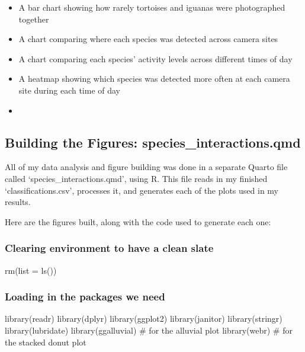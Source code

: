 \documentclass[
  letterpaper,
  DIV=11,
  numbers=noendperiod]{scrartcl}
\newenvironment{Shaded}{\begin{snugshade}}{\end{snugshade}}
\newcommand{\AttributeTok}[1]{\textcolor[rgb]{0.40,0.45,0.13}{#1}}
\newcommand{\CommentTok}[1]{\textcolor[rgb]{0.37,0.37,0.37}{#1}}
\newcommand{\FunctionTok}[1]{\textcolor[rgb]{0.28,0.35,0.67}{#1}}
\newcommand{\NormalTok}[1]{\textcolor[rgb]{0.00,0.23,0.31}{#1}}
\providecommand{\tightlist}{%
  \setlength{\itemsep}{0pt}\setlength{\parskip}{0pt}}
\begin{document}
\begin{itemize}
\tightlist
\item
  A bar chart showing how rarely tortoises and iguanas were photographed
  together
\item
  A chart comparing where each species was detected across camera sites
\item
  A chart comparing each species' activity levels across different times
  of day
\item
  A heatmap showing which species was detected more often at each camera
  site during each time of day
\item
\end{itemize}

\subsection{Building the Figures:
species\_interactions.qmd}\label{building-the-figures-species_interactions.qmd}

All of my data analysis and figure building was done in a separate
Quarto file called `species\_interactions.qmd', using R. This file reads
in my finished `classifications.csv', processes it, and generates each
of the plots used in my results.

Here are the figures built, along with the code used to generate each
one:

\subsubsection{Clearing environment to have a clean
slate}\label{clearing-environment-to-have-a-clean-slate}

\begin{Shaded}
\begin{Highlighting}[]
\FunctionTok{rm}\NormalTok{(}\AttributeTok{list =} \FunctionTok{ls}\NormalTok{())}
\end{Highlighting}
\end{Shaded}

\subsubsection{Loading in the packages we
need}\label{loading-in-the-packages-we-need}

\begin{Shaded}
\begin{Highlighting}[]
\FunctionTok{library}\NormalTok{(readr) }
\FunctionTok{library}\NormalTok{(dplyr)}
\FunctionTok{library}\NormalTok{(ggplot2)}
\FunctionTok{library}\NormalTok{(janitor)}
\FunctionTok{library}\NormalTok{(stringr)}
\FunctionTok{library}\NormalTok{(lubridate)}
\FunctionTok{library}\NormalTok{(ggalluvial) }\CommentTok{\# for the alluvial plot}
\FunctionTok{library}\NormalTok{(webr) }\CommentTok{\# for the stacked donut plot}
\end{Highlighting}
\end{Shaded}
\end{document}
